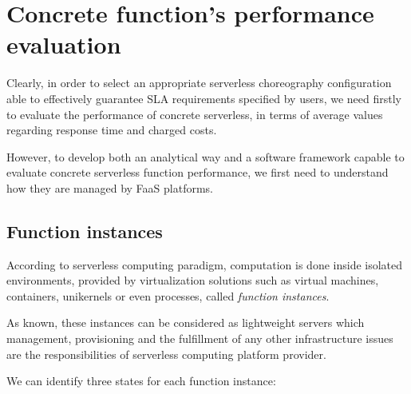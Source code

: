 \documentclass[12pt,a4paper]{report}
\begin{document}
\section{Concrete function's performance evaluation}

Clearly, in order to select an appropriate serverless choreography configuration able to effectively guarantee SLA requirements specified by users, we need firstly to evaluate the performance of concrete serverless, in terms of average values regarding response time and charged costs.

However, to develop both an analytical way and a software framework capable to evaluate concrete serverless function performance, we first need to understand
how they are managed by FaaS platforms.

\subsection{Function instances}

According to serverless computing paradigm, computation is done inside isolated environments, provided by virtualization solutions such as virtual machines, containers, unikernels or even processes, called \textit{function instances}.

As known, these instances can be considered as lightweight servers which management, provisioning and the fulfillment of any other infrastructure issues are the responsibilities of serverless computing platform provider.

We can identify three states for each function instance:
\end{document}
